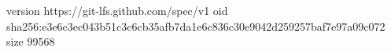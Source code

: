 version https://git-lfs.github.com/spec/v1
oid sha256:e3e6c3ec043b51c3c6cb35afb7da1e6c836c30e9042d259257baf7e97a09c072
size 99568
